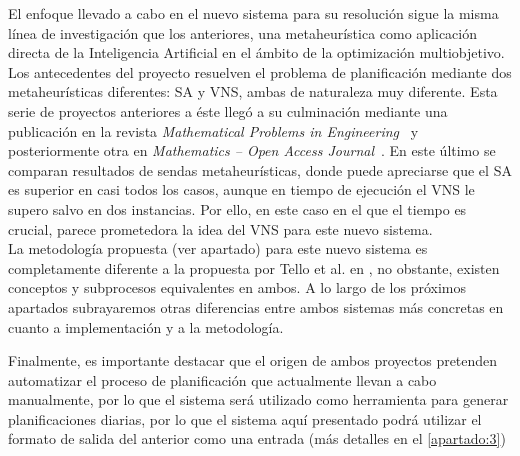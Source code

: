 El enfoque llevado a cabo en el nuevo sistema para su resolución sigue la misma línea de investigación que los 
anteriores, una metaheurística como aplicación directa de la Inteligencia Artificial en el ámbito de la optimización 
multiobjetivo.
Los antecedentes del proyecto resuelven el problema de planificación mediante dos metaheurísticas diferentes: 
\gls{SA} y \gls{VNS}, ambas de naturaleza muy diferente. 
Esta serie de proyectos anteriores a éste llegó a su culminación mediante una publicación en la revista 
\textit{Mathematical Problems in Engineering}~\cite{articulo1} y posteriormente otra en \textit{Mathematics -- Open 
Access Journal}~\cite{articulo2}. 
En este último se comparan resultados de sendas metaheurísticas, donde puede apreciarse que el SA es superior en casi 
todos los casos, aunque en tiempo de ejecución el VNS le supero salvo en dos instancias. Por ello, en este caso en el 
que el tiempo es crucial, parece prometedora la idea del VNS para este nuevo sistema. 
\\

La metodología propuesta (ver apartado) para este nuevo sistema es completamente diferente a la propuesta por Tello et 
al. en \cite{articulo1}, no obstante, existen conceptos y subprocesos equivalentes en ambos. A lo largo de los próximos 
apartados subrayaremos otras diferencias entre ambos sistemas más concretas en cuanto a implementación y a la 
metodología.

Finalmente, es importante destacar que el origen de ambos proyectos pretenden automatizar el proceso de planificación 
que actualmente llevan a cabo manualmente, por lo que el sistema \legacy{} será utilizado como herramienta para generar 
planificaciones diarias, por lo que el sistema aquí presentado podrá utilizar el formato de salida del anterior como 
una entrada (más detalles en el \autoref{apartado:3}) 


